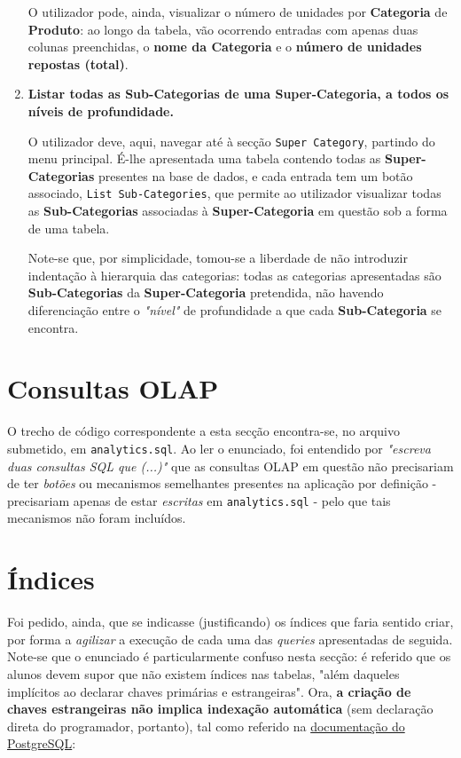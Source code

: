 \documentclass[12pt,a4paper]{article}
\begin{document}
\begin{enumerate}
        O utilizador pode, ainda, visualizar o número
        de unidades por \textbf{Categoria} de \textbf{Produto}: ao longo da tabela,
        vão ocorrendo entradas com apenas duas colunas preenchidas, o \textbf{nome
          da Categoria} e o \textbf{número de unidades repostas (total)}.

  \item \textbf{Listar todas as Sub-Categorias de uma Super-Categoria, a todos
          os níveis de profundidade.}

        O utilizador deve, aqui, navegar até à secção \texttt{Super Category},
        partindo do menu principal. É-lhe apresentada uma tabela contendo todas as
        \textbf{Super-Categorias} presentes na base de dados, e cada entrada tem um
        botão associado, \texttt{List Sub-Categories}, que permite ao utilizador
        visualizar todas as \textbf{Sub-Categorias} associadas à \textbf{Super-Categoria}
        em questão sob a forma de uma tabela.

        Note-se que, por simplicidade, tomou-se a liberdade de não introduzir indentação
        à hierarquia das categorias: todas as categorias apresentadas são
        \textbf{Sub-Categorias} da \textbf{Super-Categoria} pretendida, não havendo diferenciação
        entre o \textit{"nível"} de profundidade a que cada \textbf{Sub-Categoria} se encontra.

\end{enumerate}


\section*{Consultas OLAP}

O trecho de código correspondente a esta secção encontra-se, no arquivo submetido,
em \texttt{analytics.sql}. Ao ler o enunciado, foi entendido por \textit{"escreva
  duas consultas SQL que (...)"} que as consultas OLAP em questão não precisariam
de ter \textit{botões} ou mecanismos semelhantes presentes na aplicação por
definição - precisariam apenas de estar \textit{escritas} em \texttt{analytics.sql} -
pelo que tais mecanismos não foram incluídos.

\section*{Índices}

Foi pedido, ainda, que se indicasse (justificando) os índices que faria sentido
criar, por forma a \textit{agilizar} a execução de cada uma das \textit{queries}
apresentadas de seguida. Note-se que o enunciado é particularmente confuso nesta
secção: é referido que os alunos devem supor que não existem índices nas tabelas,
"além daqueles implícitos ao declarar chaves primárias e estrangeiras". Ora, \textbf{a
  criação de chaves estrangeiras não implica indexação automática} (sem declaração
direta do programador, portanto), tal como referido na
\href{https://www.postgresql.org/docs/current/ddl-constraints.html#DDL-CONSTRAINTS-FK}
{documentação do PostgreSQL}:
\end{document}
